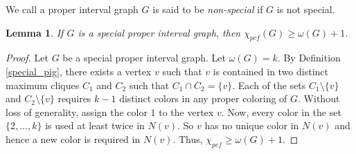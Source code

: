 \documentclass[11pt]{article}
\theoremstyle{plain}
\newtheorem{lemma}{Lemma}
\begin{document}
We call a proper interval graph $G$ is said to be \emph{non-special} if $G$ is not special.
\begin{lemma}\label{spcl_pig_bound}
	If $G$ is a special proper interval graph, then $\chi_{pcf}(G) \geq\omega(G)+1$.
\end{lemma}
\begin{proof}
	Let $G$ be a special proper interval graph. Let $\omega(G) = k$. 
	By Definition \ref{special_pig}, there exists a vertex $v$ such that $v$ is contained in two distinct maximum cliques $C_1$ and $C_2$ such that $C_1\cap C_2 = \{v\}$.
	Each of the sets $C_1\setminus\{v\}$ and $C_2\setminus \{v\}$ requires $k-1$ distinct colors in any proper coloring of $G$. Without loss of generality, assign the color $1$ to the vertex $v$.
	Now, every color in the set $\{2, \ldots, k\}$ is used at least twice in $N(v)$. So $v$ has no unique color in $N(v)$ and hence a new color is required in $N(v)$. Thus, $\chi_{pcf} \geq\omega(G)+1$.
\end{proof}

\begin{algorithm}[h]\label{pig_algo}
	\DontPrintSemicolon
	\caption{\textsc{PCF-ColorPIG}($G$)}
\end{algorithm}
\end{document}
